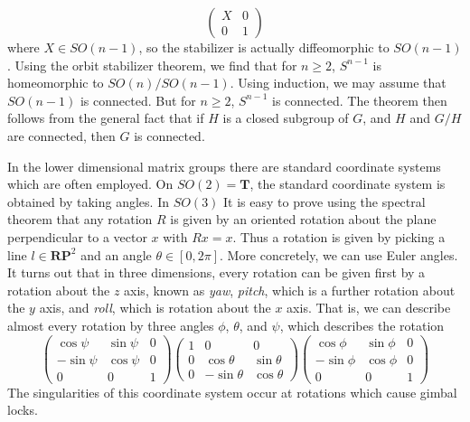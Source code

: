 \begin{example}
    \[ \begin{pmatrix} X & 0 \\ 0 & 1 \end{pmatrix} \]
    where $X \in SO(n-1)$, so the stabilizer is actually diffeomorphic to $SO(n-1)$. Using the orbit stabilizer theorem, we find that for $n \geq 2$, $S^{n-1}$ is homeomorphic to $SO(n)/SO(n-1)$. Using induction, we may assume that $SO(n-1)$ is connected. But for $n \geq 2$, $S^{n-1}$ is connected. The theorem then follows from the general fact that if $H$ is a closed subgroup of $G$, and $H$ and $G/H$ are connected, then $G$ is connected.
\end{example}

\begin{remark}
    In the lower dimensional matrix groups there are standard coordinate systems which are often employed. On $SO(2) = \mathbf{T}$, the standard coordinate system is obtained by taking angles. In $SO(3)$ It is easy to prove using the spectral theorem that any rotation $R$ is given by an oriented rotation about the plane perpendicular to a vector $x$ with $Rx = x$. Thus a rotation is given by picking a line $l \in \mathbf{RP}^2$ and an angle $\theta \in [0,2\pi]$. More concretely, we can use Euler angles. It turns out that in three dimensions, every rotation can be given first by a rotation about the $z$ axis, known as {\it yaw}, {\it pitch}, which is a further rotation about the $y$ axis, and {\it roll}, which is rotation about the $x$ axis. That is, we can describe almost every rotation by three angles $\phi$, $\theta$, and $\psi$, which describes the rotation
    \[ \begin{pmatrix} \cos \psi & \sin \psi & 0 \\ - \sin \psi & \cos \psi & 0 \\ 0 & 0 & 1 \end{pmatrix} \begin{pmatrix} 1 & 0 & 0 \\ 0 & \cos \theta & \sin \theta \\ 0 & - \sin \theta & \cos \theta \end{pmatrix} \begin{pmatrix} \cos \phi & \sin \phi & 0 \\ -\sin \phi & \cos \phi & 0 \\ 0 & 0 & 1 \end{pmatrix} \]
    The singularities of this coordinate system occur at rotations which cause gimbal locks.
\end{remark}

